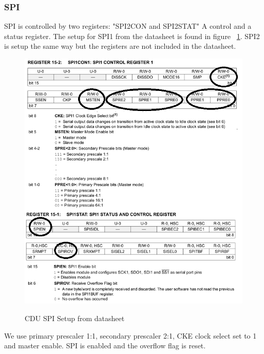 \subsubsection{SPI}
SPI is controlled by two registers: "SPI2CON and SPI2STAT" A control and a status register. The setup for SPI1 from the datasheet is found in figure ~\ref{fig:spisetup}. SPI2 is setup the same way but the registers are not included in the datasheet.\\
\begin{figure}[H]
\centering
\includegraphics[width=1\textwidth]{billeder/spisetup}
\label{fig:spisetup}
\caption{CDU SPI Setup from datasheet}
\end{figure}
We use primary prescaler 1:1, secondary prescaler 2:1, CKE clock select set to 1 and master enable. SPI is enabled and the overflow flag is reset.
